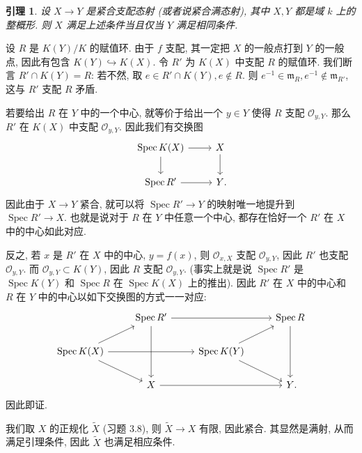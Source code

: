 \documentclass{article}
\theoremstyle{exercise}
\theoremstyle{plain}
\newtheorem*{lemma*}{引理}
\theoremstyle{remark}
\newenvironment{proofc}{\proof}{\endproof}
\def\gm{\mathfrak{m}}
\def\sO{\mathscr{O}}
\def\Spec{\operatorname{Spec}}
\begin{document}
\begin{proofc}
\begin{enumerate}[label=(\alph*)]
          \begin{lemma*}
            设 $X \to Y$ 是紧合支配态射 (或者说紧合满态射),
            其中 $X, Y$ 都是域 $k$ 上的整概形.
            则 $X$ 满足上述条件当且仅当 $Y$ 满足相同条件.
          \end{lemma*}

          \begin{proofc}
            设 $R$ 是 $K(Y) / K$ 的赋值环.
            由于 $f$ 支配, 其一定把 $X$ 的一般点打到 $Y$ 的一般点,
            因此有包含 $K(Y) \hookrightarrow K(X)$.
            令 $R'$ 为 $K(X)$ 中支配 $R$ 的赋值环.
            我们断言 $R' \cap K(Y) = R$: 若不然, 取 $e \in R' \cap K(Y), e \notin R$.
            则 $e^{-1} \in \gm_R, e^{-1} \notin \gm_{R'}$, 这与 $R'$ 支配 $R$ 矛盾.

            若要给出 $R$ 在 $Y$ 中的一个中心, 就等价于给出一个 $y \in Y$
            使得 $R$ 支配 $\sO_{y, Y}$. 那么 $R'$ 在 $K(X)$ 中支配 $\sO_{y, Y}$.
            因此我们有交换图
            \[\begin{tikzcd}
                \Spec K(X) \ar[r] \ar[d] & X \ar[d] \\
                \Spec R' \ar[r]          & Y\rlap{.}
              \end{tikzcd}\]
            因此由于 $X \to Y$ 紧合, 就可以将 $\Spec R' \to Y$ 的映射唯一地提升到 $\Spec R' \to X$.
            也就是说对于 $R$ 在 $Y$ 中任意一个中心, 都存在恰好一个 $R'$ 在 $X$ 中的中心如此对应.

            反之, 若 $x$ 是 $R'$ 在 $X$ 中的中心, $y = f(x)$,
            则 $\sO_{x, X}$ 支配 $\sO_{y, Y}$, 因此 $R'$ 也支配 $\sO_{y, Y}$.
            而 $\sO_{y, Y} \subset K(Y)$, 因此 $R$ 支配 $\sO_{y, Y}$.
            (事实上就是说 $\Spec R'$ 是 $\Spec K(Y)$ 和 $\Spec R$ 在 $\Spec K(X)$ 上的推出).
            因此 $R'$ 在 $X$ 中的中心和 $R$ 在 $Y$ 中的中心以如下交换图的方式一一对应:
            \[\begin{tikzcd}
                & \Spec R' \ar[rr] \ar[dd] & & \Spec R \ar[dd] \\
                \Spec K(X) \ar[ru] \ar[rd] \ar[rr] & & \Spec K(Y) \ar[ru] \ar[rd] & \\
                & X \ar[rr] & & Y\rlap{.}
              \end{tikzcd}\]
            因此即证.
          \end{proofc}

          我们取 $X$ 的正规化 $\tilde{X}$ (习题 3.8),
          则 $\tilde{X} \to X$ 有限, 因此紧合. 其显然是满射,
          从而满足引理条件, 因此 $\tilde{X}$ 也满足相应条件.


\end{enumerate}
\end{proofc}
\end{document}
